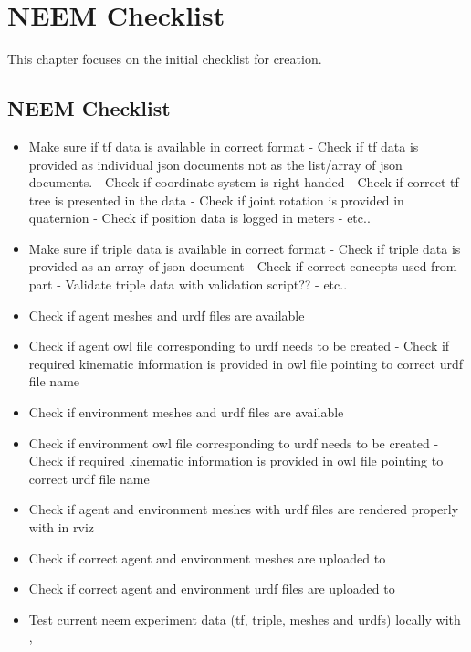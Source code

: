 \chapter{NEEM Checklist}
\label{ch:initial_checklist}

This chapter focuses on the initial checklist for \neems creation.

\section{NEEM Checklist}

\begin{itemize}
	\item Make sure if tf data is available in correct format 
		\subitem - Check if tf data is provided as individual json documents not as the list/array of json documents.
		\subitem - Check if coordinate system is right handed
		\subitem - Check if correct tf tree is presented in the data
		\subitem - Check if joint rotation is provided in quaternion
		\subitem - Check if position data is logged in meters
		\subitem - etc..
	\item Make sure if triple data is available in correct format 
		\subitem - Check if triple data is provided as an array of json document
		\subitem - Check if correct \soma concepts used from \neemnar part
		\subitem - Validate triple data with \neem validation script??
		\subitem - etc..
		
	\item Check if agent meshes and urdf files are available
	\item Check if agent owl file corresponding to urdf needs to be created
		\subitem - Check if required kinematic information is provided in owl file pointing to correct urdf file name 
	\item Check if environment meshes and urdf files are available
	\item Check if environment owl file corresponding to urdf needs to be created
			\subitem - Check if required kinematic information is provided in owl file pointing to correct urdf file name 
	\item Check if agent and environment meshes with urdf files are rendered properly with \knowrob in rviz 
	\item Check if correct agent and environment meshes are uploaded to \neemhub
	\item Check if correct agent and environment urdf files are uploaded to \neemhub
	\item Test current neem experiment data (tf, triple, meshes and urdfs) locally with \knowrob, 
	

\end{itemize}
